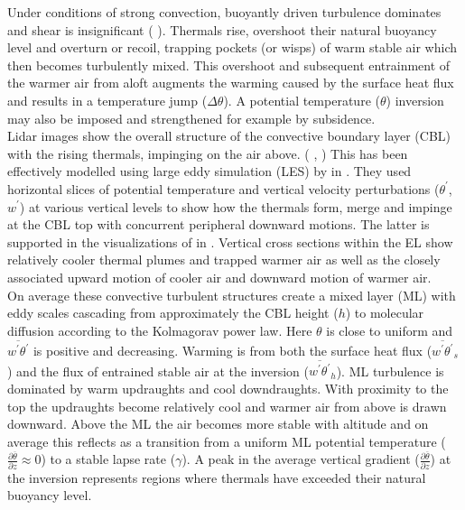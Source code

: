 Under conditions of strong convection, 
buoyantly driven turbulence dominates and shear is insignificant (\citeauthor{DirLEddy} \cite{DirLEddy}). Thermals rise, overshoot their
natural buoyancy level and overturn or recoil, trapping pockets (or wisps) of warm stable air which then becomes turbulently mixed.  This
overshoot and subsequent entrainment of the warmer air from aloft augments the warming caused by the surface heat flux and results in a
temperature jump ($\Delta \theta$).  A potential temperature ($\theta$) inversion may also be imposed and strengthened for example by subsidence.\\  

Lidar images show the overall structure of the convective boundary layer (\acs{CBL}) with the rising thermals, impinging on the air above.
(\citeauthor{CrumStullEl} \cite{CrumStullEl}, \citeauthor{Traum11} \cite{Traum11}) This has been effectively modelled using large eddy simulation (\acs{LES})
by \citeauthor{SchmidtSchu} in \cite{SchmidtSchu}.  They used horizontal slices of potential temperature and vertical velocity perturbations
($\theta^{'}$, $w^{'}$) at various vertical levels to show how the thermals form, merge and impinge at the \acs{CBL} top with concurrent peripheral downward motions.  The latter is supported in the visualizations of \citeauthor{SullMoengStev} in \cite{SullMoengStev}.  Vertical cross sections within the \acs{EL} show relatively cooler thermal plumes and trapped warmer air as well as the closely associated upward motion of cooler air and downward motion of warmer air.\\ 

On average these convective turbulent structures create a mixed layer (\acs{ML}) with eddy scales cascading from approximately the \acs{CBL} height 
($h$) to molecular diffusion according to the Kolmagorav power law.  Here $\theta$ is close to uniform and $\overline{w^{'}\theta^{'}}$ is positive and decreasing. Warming is from both the surface heat flux ($\overline{w^{'}\theta^{'}}_{s}$) and the flux of entrained stable air at the
 inversion ($\overline{w^{'}\theta^{'}}_{h}$).  \acs{ML} turbulence is dominated by warm updraughts and cool downdraughts.  With proximity
to the top the updraughts become relatively cool and warmer air from above is drawn downward.  Above the \acs{ML} the air becomes more stable with altitude and on average this reflects as a transition from a uniform \acs{ML} potential temperature ($\frac{\partial \overline{\theta}}{\partial z} \approx 0$) to a stable lapse rate ($\gamma$).  A peak in the average vertical gradient ($\frac{\partial \overline{\theta}}{\partial z}$) at the inversion represents regions where thermals have exceeded their natural buoyancy level. \\

